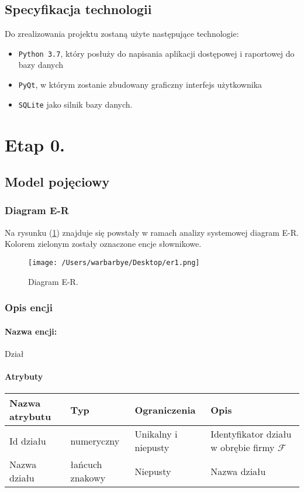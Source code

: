 \documentclass{article}
\begin{document}
\subsection{Specyfikacja technologii}
	Do zrealizowania projektu zostaną użyte następujące technologie:
		\begin{itemize}
			\item \texttt{Python 3.7}, który posłuży do napisania aplikacji dostępowej i raportowej do bazy danych
			\item \texttt{PyQt}, w którym zostanie zbudowany graficzny interfejs użytkownika
			\item \texttt{SQLite} jako silnik bazy danych.
		\end{itemize}
\newpage
\section{Etap 0. \label{s0}}
\subsection{Model pojęciowy}
\subsubsection{Diagram E-R}
Na rysunku (\ref{er1}) znajduje się powstały w ramach analizy systemowej diagram E-R. Kolorem zielonym zostały oznaczone encje słownikowe.
\begin{figure}[H]
			\centering
			\texttt{[image: /Users/warbarbye/Desktop/er1.png]}
			\label{er1}
			\caption{Diagram E-R.}
\end{figure}
\subsubsection{Opis encji}
\paragraph{Nazwa encji:\\ }
Dział
\paragraph{Atrybuty\\ }
\begin{table}[H]
\begin{tabular}{|l|l|l|l|}
\hline
\textbf{Nazwa atrybutu} & \textbf{Typ}    & \textbf{Ograniczenia} & \textbf{Opis}                                      \\ \hline
Id działu               & numeryczny      & Unikalny i niepusty   & Identyfikator działu w obrębie firmy $\mathcal{F}$ \\ \hline
Nazwa działu            & łańcuch znakowy & Niepusty              & Nazwa działu                                       \\ \hline
\end{tabular}
\end{table}
\end{document}
